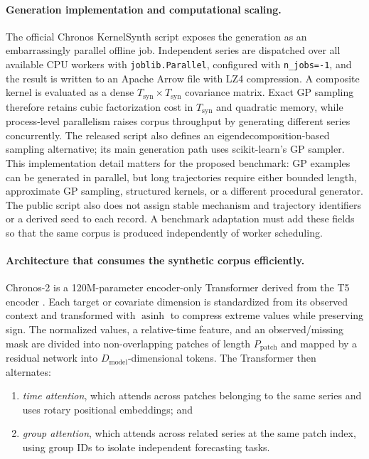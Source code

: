 \paragraph{Generation implementation and computational scaling.}
The official Chronos KernelSynth script exposes the generation as an
embarrassingly parallel offline job. Independent series are dispatched over
all available CPU workers with \texttt{joblib.Parallel}, configured with
\texttt{n\_jobs=-1}, and the
result is written to an Apache Arrow file with LZ4 compression. A composite
kernel is evaluated as a dense $T_{\mathrm{syn}}\times T_{\mathrm{syn}}$
covariance matrix. Exact GP sampling therefore retains cubic factorization
cost in $T_{\mathrm{syn}}$ and quadratic memory, while process-level parallelism
raises corpus throughput by generating different series concurrently. The
released script also defines an eigendecomposition-based sampling alternative;
its main generation path uses scikit-learn's GP sampler. This implementation
detail matters for the proposed benchmark: GP examples can be generated in
parallel, but long trajectories require either bounded length, approximate GP
sampling, structured kernels, or a different procedural generator. The public
script also does not assign stable mechanism and trajectory identifiers or a
derived seed to each record. A benchmark adaptation must add these fields so
that the same corpus is produced independently of worker scheduling.

\paragraph{Architecture that consumes the synthetic corpus efficiently.}
Chronos-2 is a 120M-parameter encoder-only Transformer derived from the T5
encoder \citep{ansari2025chronos2}. Each target or covariate dimension is
standardized from its observed context and transformed with $\operatorname{asinh}$
to compress extreme values while preserving sign. The normalized values, a
relative-time feature, and an observed/missing mask are divided into
non-overlapping patches of length $P_{\mathrm{patch}}$ and mapped by a residual
network into $D_{\mathrm{model}}$-dimensional tokens. The Transformer then
alternates:

\begin{enumerate}
    \item \emph{time attention}, which attends across patches belonging to the
    same series and uses rotary positional embeddings; and
    \item \emph{group attention}, which attends across related series at the
    same patch index, using group IDs to isolate independent forecasting tasks.
\end{enumerate}

